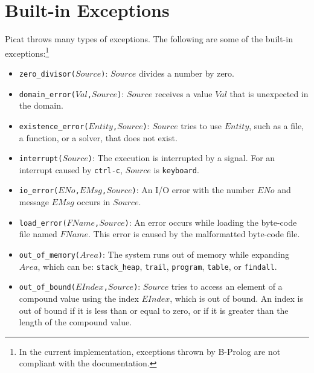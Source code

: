 \section{Built-in Exceptions}
Picat throws many types of exceptions. The following are some of the built-in exceptions:\footnote{In the current implementation, exceptions thrown by B-Prolog are not compliant with the documentation.}
\begin{itemize}
\item \texttt{zero\_divisor($Source$)}: $Source$ divides a number by zero.
\item \texttt{domain\_error($Val$,$Source$)}: $Source$ receives a value $Val$ that is unexpected in the domain.
\item \texttt{existence\_error($Entity$,$Source$)}: $Source$ tries to use $Entity$, such as a file, a function, or a solver, that does not exist.
\item \texttt{interrupt($Source$)}: The execution is interrupted by a signal. For an interrupt caused by \texttt{ctrl-c}, $Source$ is \texttt{keyboard}.
\item \texttt{io\_error($ENo$,$EMsg$,$Source$)}: An I/O error with the number $ENo$ and message $EMsg$ occurs in $Source$.
\item \texttt{load\_error($FName$,$Source$)}: An error occurs while loading the byte-code file named $FName$.  This error is caused by the malformatted byte-code file.
\item \texttt{out\_of\_memory($Area$)}: The system runs out of memory while expanding $Area$, which can be: \texttt{stack\_heap}, \texttt{trail}, \texttt{program}, \texttt{table}, or \texttt{findall}.
\item \texttt{out\_of\_bound($EIndex$,$Source$)}: $Source$ tries to access an element of a compound value using the index $EIndex$, which is out of bound.  An index is out of bound if it is less than or equal to zero, or if it is greater than the length of the compound value.

\end{itemize}
